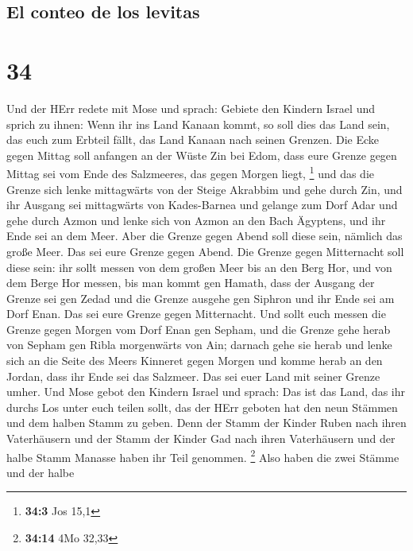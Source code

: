 \hypertarget{el-conteo-de-los-levitas}{%
\subsection{El conteo de los levitas}\label{el-conteo-de-los-levitas}}

\hypertarget{section-33}{%
\section{34}\label{section-33}}

 Und der HErr redete mit Mose und sprach: 
Gebiete den Kindern Israel und sprich zu ihnen: Wenn ihr ins Land Kanaan
kommt, so soll dies das Land sein, das euch zum Erbteil fällt, das Land
Kanaan nach seinen Grenzen.  Die Ecke gegen Mittag soll
anfangen an der Wüste Zin bei Edom, dass eure Grenze gegen Mittag sei
vom Ende des Salzmeeres, das gegen Morgen liegt, \footnote{\textbf{34:3}
  Jos 15,1}  und das die Grenze sich lenke mittagwärts von
der Steige Akrabbim und gehe durch Zin, und ihr Ausgang sei mittagwärts
von Kades-Barnea und gelange zum Dorf Adar und gehe durch Azmon
 und lenke sich von Azmon an den Bach Ägyptens, und ihr
Ende sei an dem Meer.  Aber die Grenze gegen Abend soll
diese sein, nämlich das große Meer. Das sei eure Grenze gegen Abend.
 Die Grenze gegen Mitternacht soll diese sein: ihr sollt
messen von dem großen Meer bis an den Berg Hor,  und von
dem Berge Hor messen, bis man kommt gen Hamath, dass der Ausgang der
Grenze sei gen Zedad  und die Grenze ausgehe gen Siphron
und ihr Ende sei am Dorf Enan. Das sei eure Grenze gegen Mitternacht.
 Und sollt euch messen die Grenze gegen Morgen vom Dorf
Enan gen Sepham,  und die Grenze gehe herab von Sepham
gen Ribla morgenwärts von Ain; darnach gehe sie herab und lenke sich an
die Seite des Meers Kinneret gegen Morgen  und komme
herab an den Jordan, dass ihr Ende sei das Salzmeer. Das sei euer Land
mit seiner Grenze umher.  Und Mose gebot den Kindern
Israel und sprach: Das ist das Land, das ihr durchs Los unter euch
teilen sollt, das der HErr geboten hat den neun Stämmen und dem halben
Stamm zu geben.  Denn der Stamm der Kinder Ruben nach
ihren Vaterhäusern und der Stamm der Kinder Gad nach ihren Vaterhäusern
und der halbe Stamm Manasse haben ihr Teil genommen. \footnote{\textbf{34:14}
  4Mo 32,33}  Also haben die zwei Stämme und der halbe
